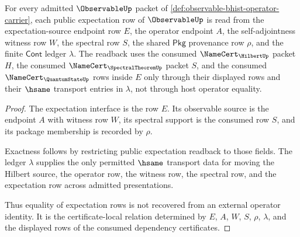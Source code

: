 \begin{theorem}
\label{thm:observable-state-expectation-ledger-exactness}
For every admitted $\ObservableUp$ packet of
\autoref{def:observable-bhist-operator-carrier}, each public expectation row
of $\ObservableUp$ is read from the expectation-source endpoint row $E$, the
operator endpoint $A$, the self-adjointness witness row $W$, the spectral row
$S$, the shared $\mathsf{Pkg}$ provenance row $\rho$, and the finite
$\mathsf{Cont}$ ledger $\lambda$. The readback uses the consumed
$\NameCert_{\HilbertUp}$ packet $H$, the consumed
$\NameCert_{\SpectralTheoremUp}$ packet $S$, and the consumed
$\NameCert_{\QuantumStateUp}$ rows inside $E$ only through their displayed
rows and their $\hsame$ transport entries in $\lambda$, not through host
operator equality.
\end{theorem}
\begin{proof}
The expectation interface is the row $E$. Its observable source is the
endpoint $A$ with witness row $W$, its spectral support is the consumed row
$S$, and its package membership is recorded by $\rho$.

Exactness follows by restricting public expectation readback to those fields.
The ledger $\lambda$ supplies the only permitted $\hsame$ transport data for
moving the Hilbert source, the operator row, the witness row, the spectral
row, and the expectation row across admitted presentations.

Thus equality of expectation rows is not recovered from an external operator
identity. It is the certificate-local relation determined by $E$, $A$, $W$,
$S$, $\rho$, $\lambda$, and the displayed rows of the consumed dependency
certificates.
\end{proof}

